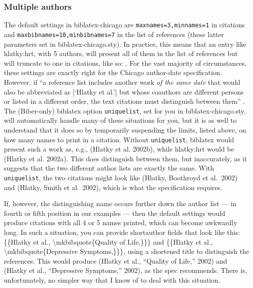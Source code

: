 \documentclass[a4paper,12pt]{report}
\begin{document}
\subsubsection*{Multiple authors}
\label{sec:multiple}

The default settings in \textsf{biblatex-chicago} are
\texttt{maxnames=3,minnames=1} in citations and
\texttt{max\-bibnames=10,minbibnames=7} in the list of references
(these latter parameters set in \textsf{biblatex-chicago.sty}).  In
practice, this means that an entry like hlatky:hrt, with 5 authors,
will present all of them in the list of references but will truncate
to one in citations, like so: \autocite{hlatky:hrt}.  For the vast
majority of circumstances, these settings are exactly right for the
Chicago author-date specification.  However, if \enquote{a reference
  list includes another work \emph{of the same date} that would also
  be abbreviated as [\enquote{Hlatky et al.}] but whose coauthors are
  different persons or listed in a different order, the text citations
  must distinguish between them} \autocite[15.28]{chicago:manual}.
The (\textsf{Biber}-only) \textsf{biblatex} option
\texttt{uniquelist}, set for you in \textsf{biblatex-chicago.sty},
will automatically handle many of these situations for you, but it is
as well to understand that it does so by temporarily suspending the
limits, listed above, on how many names to print in a citation.
Without \texttt{uniquelist}, \textsf{biblatex} would present such a
work as, e.g., (Hlatky et al. 2002b), while hlatky:hrt would be
(Hlatky et al. 2002a).  This does distinguish between them, but
inaccurately, as it suggests that the two different author lists are
exactly the same.  With \texttt{uniquelist}, the two citations might
look like (Hlatky, Boothroyd et al.\ 2002) and (Hlatky, Smith et al.\
2002), which is what the specification requires.

If, however, the distinguishing name occurs further down the author
list --- in fourth or fifth position in our examples --- then the
default settings would produce citations with all 4 or 5 names
printed, which can become awkwardly long.  In such a situation, you
can provide \textsf{shortauthor} fields that look like this:
\{\{Hlatky et al., \textbackslash mkbibquote\{Quality of Life,\}\}\}
and \{\{Hlatky et al., \textbackslash mkbibquote\{Depressive
Symptoms,\}\}\}, using a shortened title to distinguish the
references.  This would produce (Hlatky et al., \enquote{Quality of
  Life,} 2002) and (Hlatky et al., \enquote{Depressive Symptoms,}
2002), as the spec recommends.  There is, unfortunately, no simpler
way that I know of to deal with this situation.
\end{document}
